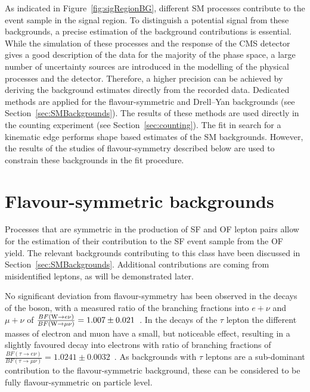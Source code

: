 \label{sec:backgrounds}
As indicated in Figure~\ref{fig:sigRegionBG}, different SM processes contribute to the event sample in the signal region. To distinguish a potential signal from these backgrounds, a precise estimation of the background contributions is essential. While the simulation of these processes and the response of the CMS detector gives a good description of the data for the majority of the phase space, a large number of uncertainty sources are introduced in the modelling of the physical processes and the detector. Therefore, a higher precision can be achieved by deriving the background estimates directly from the recorded data. Dedicated methods are applied for the flavour-symmetric and Drell--Yan backgrounds (see Section~\ref{sec:SMBackgrounds}). The results of these methods are used directly in the counting experiment (see Section~\ref{sec:counting}). The fit in search for a kinematic edge performs shape based estimates of the SM backgrounds. However, the results of the studies of flavour-symmetry described below are used to constrain these backgrounds in the fit procedure.

\section{Flavour-symmetric backgrounds}
Processes that are symmetric in the production of SF and OF lepton pairs allow for the estimation of their contribution to the SF event sample from the OF yield. The relevant backgrounds contributing to this class have been discussed in Section~\ref{sec:SMBackgrounds}. Additional contributions are coming from misidentified leptons, as will be demonstrated later. 

No significant deviation from flavour-symmetry has been observed in the decays of the \W boson, with a measured ratio of the branching fractions into $e+\nu$ and $\mu + \nu$ of $\frac{BF(\mathrm{W}\rightarrow e\nu)}{BF(\mathrm{W}\rightarrow \mu\nu)} = 1.007\pm0.021$~\cite{PDG}. In the decays of the $\tau$ lepton the different masses of electron and muon have a small, but noticeable effect, resulting in a slightly favoured decay into electrons with ratio of branching fractions of  $\frac{BF(\tau\rightarrow e\nu)}{BF(\tau\rightarrow \mu\nu)} = 1.0241\pm0.0032$~\cite{PDG}. As backgrounds with $\tau$ leptons are a sub-dominant contribution to the flavour-symmetric background, these can be considered to be fully flavour-symmetric on particle level. 


